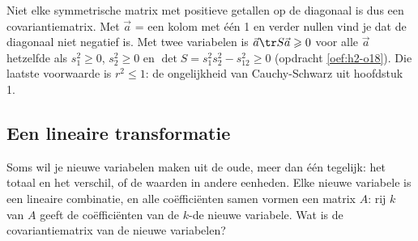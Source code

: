 Niet elke symmetrische matrix met positieve getallen op de diagonaal is dus een covariantiematrix. Met $\vec a$ = een kolom met één 1 en verder nullen vind je dat de diagonaal niet negatief is. Met twee variabelen is $\vec a\tr S\vec a \geqslant 0$ voor alle $\vec a$ hetzelfde als $s_1^2 \geqslant 0$, $s_2^2 \geqslant 0$ en $\det S = s_1^2 s_2^2 - s_{12}^2 \geqslant 0$ (opdracht \ref{oef:h2-o18}). Die laatste voorwaarde is $r^2 \leqslant 1$: de ongelijkheid van Cauchy-Schwarz uit hoofdstuk 1.


\begin{oefeningen}
\end{oefeningen}

\subsection{Een lineaire transformatie}

Soms wil je nieuwe variabelen maken uit de oude, meer dan één tegelijk: het totaal en het verschil, of de waarden in andere eenheden. Elke nieuwe variabele is een lineaire combinatie, en alle coëfficiënten samen vormen een matrix $A$: rij $k$ van $A$ geeft de coëfficiënten van de $k$-de nieuwe variabele. Wat is de covariantiematrix van de nieuwe variabelen?

